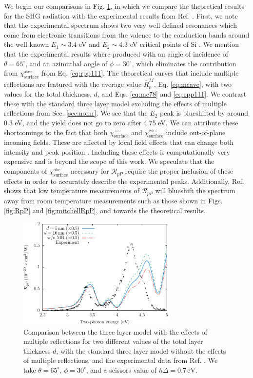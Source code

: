 We begin our comparisons in Fig. \ref{fig:average}, in which we compare the
theoretical results for the SHG radiation with the experimental results from
Ref. \cite{mejiaPRB02}. First, we note that the experimental spectrum shows two
very well defined resonances which come from electronic transitions from the
valence to the conduction bands around the well known $E_{1}\sim 3.4$ eV and
$E_{2}\sim 4.3$ eV critical points of Si \cite{yubook}. We mention that the
experimental results where produced with an angle of incidence of
$\theta=65^\circ$, and an azimuthal angle of $\phi=30^\circ$, which eliminates
the contribution from $\chi^{xxx}_{\mathrm{surface}}$ from Eq.
\eqref{eq:rpp111}. The theoretical curves that include multiple reflections are
featured with the average value $\bar{R}^{M}_{p}$, Eq.
\eqref{eq:mcave}, with two values for the total thickness, $d$, and Eqs.
\eqref{eq:mc78} and \eqref{eq:rpp111}. We contrast these with the standard three
layer model excluding the effects of multiple reflections from Sec.
\ref{sec:nomr}. We see that the $E_{2}$ peak is blueshifted by around 0.3 eV,
and the yield does not go to zero after 4.75 eV. We can attribute these
shortcomings to the fact that both $\chi^{zzz}_{\mathrm{surface}}$ and
$\chi^{xxz}_{\mathrm{surface}}$ include out-of-plane incoming fields. These are
affected by local field effects that can change both intensity and peak position
\cite{tancognedejean:tel-01235611}. Including these effects is computationally
very expensive and is beyond the scope of this work. We speculate that the
components of $\chi^{abc}_{\mathrm{surface}}$ necessary for $\mathcal{R}_{pP}$
require the proper inclusion of these effects in order to accurately describe
the experimental peaks. Additionally, Ref. \cite{dadapPRB97} shows that low
temperature measurements of $\mathcal{R}_{pP}$ will blueshift the spectrum away
from room temperature measurements such as those shown in Figs. \ref{fig:RpP}
and \ref{fig:mitchellRpP}, and towards the theoretical results.

\begin{figure}[t]
\centering
\includegraphics[width=0.7\textwidth]{content/figures/fig-Si1x1-MRthickness}
\caption{Comparison between the three layer model with the effects of multiple
reflections for two different values of the total layer thickness $d$, with the
standard three layer model without the effects of multiple reflections, and the
experimental data from Ref. \cite{mejiaPRB02}. We take $\theta=65^{\circ}$,
$\phi=30^{\circ}$, and a scissors value of $\hbar\Delta = 0.7\,\text{eV}$.}
\label{fig:average}
\end{figure}

